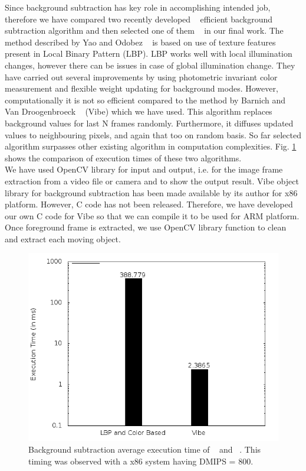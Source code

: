 \documentclass[conference]{IEEEtran}
\begin{document}
\indent Since background subtraction has key role in accomplishing
intended job, therefore we have compared two recently developed
~\cite{3, 5} efficient background subtraction algorithm and then
selected one of them ~\cite{5} in our final work.  The method described
by Yao and Odobez ~\cite{3} is based on use of texture features present
in Local Binary Pattern (LBP).  LBP works well with local illumination
changes, however there can be issues in case of global illumination
change. They have carried out several improvements by using photometric
invariant color measurement and flexible weight updating for background
modes. However, computationally it is not so efficient compared to the
method by Barnich and Van Droogenbroeck ~\cite{5} (Vibe) which we have
used. This algorithm replaces background values for last N frames
randomly.  Furthermore, it diffuses updated values to neighbouring
pixels, and again that too on random basis. So far selected algorithm
surpasses other existing algorithm in computation complexities. Fig.
\ref{bg_compare} shows the comparison of execution times of these two
algorithms.\\
\indent We have used OpenCV library for input and output, i.e.  for
the image frame extraction from a video file or camera and to show the
output result. Vibe object library for background subtraction has been
made available by its author for x86 platform. However, C code has not
been released. Therefore, we have developed our own C code for Vibe so
that we can compile it to be used for ARM platform. Once foreground
frame is extracted, we use OpenCV library function to clean and extract
each moving object.\\

\begin{figure}[!h]
\centering
\includegraphics[scale=0.35]{figures/bg_compare}
\caption{Background subtraction average execution time of ~\cite{3} and
~\cite{5}. This timing was observed with a x86 system having DMIPS =
800.}
\label{bg_compare}
\end{figure}
\end{document}
